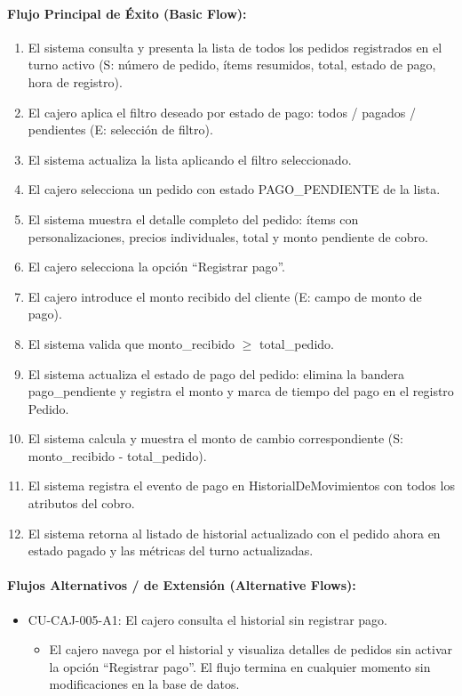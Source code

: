 \paragraph{Flujo Principal de Éxito (Basic Flow):}
\begin{enumerate}
    \item[I.] El sistema consulta y presenta la lista de todos los pedidos registrados en el turno activo (S: número de pedido, ítems resumidos, total, estado de pago, hora de registro).
    \item[II.] El cajero aplica el filtro deseado por estado de pago: todos / pagados / pendientes (E: selección de filtro).
    \item[III.] El sistema actualiza la lista aplicando el filtro seleccionado.
    \item[IV.] El cajero selecciona un pedido con estado PAGO\_PENDIENTE de la lista.
    \item[V.] El sistema muestra el detalle completo del pedido: ítems con personalizaciones, precios individuales, total y monto pendiente de cobro.
    \item[VI.] El cajero selecciona la opción ``Registrar pago''.
    \item[VII.] El cajero introduce el monto recibido del cliente (E: campo de monto de pago).
    \item[VIII.] El sistema valida que monto\_recibido $\ge$ total\_pedido.
    \item[IX.] El sistema actualiza el estado de pago del pedido: elimina la bandera pago\_pendiente y registra el monto y marca de tiempo del pago en el registro Pedido.
    \item[X.] El sistema calcula y muestra el monto de cambio correspondiente (S: monto\_recibido - total\_pedido).
    \item[XI.] El sistema registra el evento de pago en HistorialDeMovimientos con todos los atributos del cobro.
    \item[XII.] El sistema retorna al listado de historial actualizado con el pedido ahora en estado pagado y las métricas del turno actualizadas.
\end{enumerate}

\paragraph{Flujos Alternativos / de Extensión (Alternative Flows):}
\begin{itemize}
    \item CU-CAJ-005-A1: El cajero consulta el historial sin registrar pago.
    \begin{itemize}
        \item El cajero navega por el historial y visualiza detalles de pedidos sin activar la opción ``Registrar pago''. El flujo termina en cualquier momento sin modificaciones en la base de datos.
    \end{itemize}
\end{itemize}

